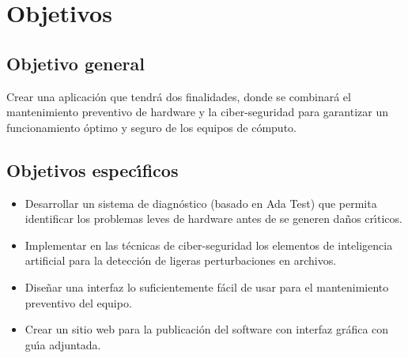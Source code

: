 \pagebreak
\section{Objetivos}
\subsection{Objetivo general}

Crear una aplicaci\'on que tendr\'a dos finalidades, donde se combinar\'a el
mantenimiento preventivo de hardware y la ciber-seguridad para garantizar un
funcionamiento \'optimo y seguro de los equipos de c\'omputo.

\subsection{Objetivos espec\'{\i}ficos}

\begin{itemize}
	\item
	      Desarrollar un sistema de diagn\'ostico (basado en Ada Test) que permita
	      identificar los problemas leves de hardware antes de se generen da\~nos
	      cr\'{\i}ticos.

	\item
	      Implementar en las t\'ecnicas de ciber-seguridad los elementos de inteligencia
	      artificial para la detecci\'on de ligeras perturbaciones en archivos.

	\item
	      Dise\~nar una interfaz lo suficientemente f\'acil de usar para el mantenimiento
	      preventivo del equipo.

	\item
	      Crear un sitio web para la publicaci\'on del software con interfaz gr\'afica
	      con gu\'{\i}a adjuntada.
\end{itemize}
